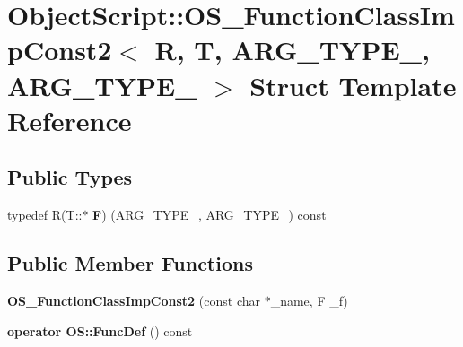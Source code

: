\hypertarget{struct_object_script_1_1_o_s___function_class_imp_const2}{}\section{Object\+Script\+:\+:O\+S\+\_\+\+Function\+Class\+Imp\+Const2$<$ R, T, A\+R\+G\+\_\+\+T\+Y\+P\+E\+\_, A\+R\+G\+\_\+\+T\+Y\+P\+E\+\_ $>$ Struct Template Reference}
\label{struct_object_script_1_1_o_s___function_class_imp_const2}
\subsection*{Public Types}
\begin{DoxyCompactItemize}
\item 
typedef R(T\+::$\ast$ {\bfseries F}) (A\+R\+G\+\_\+\+T\+Y\+P\+E\+\_, A\+R\+G\+\_\+\+T\+Y\+P\+E\+\_) const \hypertarget{struct_object_script_1_1_o_s___function_class_imp_const2_a9b476d2f2340383d94a038e64c82a101}{}\label{struct_object_script_1_1_o_s___function_class_imp_const2_a9b476d2f2340383d94a038e64c82a101}

\end{DoxyCompactItemize}
\subsection*{Public Member Functions}
\begin{DoxyCompactItemize}
\item 
{\bfseries O\+S\+\_\+\+Function\+Class\+Imp\+Const2} (const char $\ast$\+\_\+name, F \+\_\+f)\hypertarget{struct_object_script_1_1_o_s___function_class_imp_const2_a0491963ffb136ba2d9c4c7d448a95a01}{}\label{struct_object_script_1_1_o_s___function_class_imp_const2_a0491963ffb136ba2d9c4c7d448a95a01}

\item 
{\bfseries operator O\+S\+::\+Func\+Def} () const \hypertarget{struct_object_script_1_1_o_s___function_class_imp_const2_a8923e28365a7e57cf6c52c67f93ecc9b}{}\label{struct_object_script_1_1_o_s___function_class_imp_const2_a8923e28365a7e57cf6c52c67f93ecc9b}

\end{DoxyCompactItemize}
